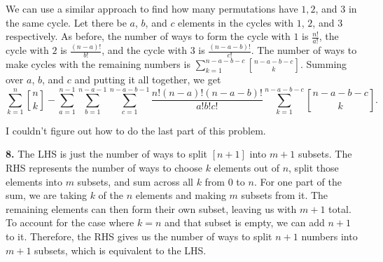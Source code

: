 \documentclass{article}
\begin{document}
We can use a similar approach to find how many permutations have $1, 2$, and $3$ in the same cycle. Let there be $a$, $b$, and $c$ elements in the cycles with $1$, $2$, and $3$ respectively. As before, the number of ways to form the cycle with $1$ is $\frac{n!}{a!}$, the cycle with $2$ is $\frac{(n - a)!}{b!}$, and the cycle with $3$ is $\frac{(n - a - b)!}{c!}$. The number of ways to make cycles with the remaining numbers is $\sum_{k = 1}^{n - a - b - c}{{n - a - b - c}\brack k}$. Summing over $a$, $b$, and $c$ and putting it all together, we get $$\sum_{k = 1}^n{n\brack k} - \sum_{a = 1}^{n - 1}\sum_{b = 1}^{n - a - 1}\sum_{c = 1}^{n - a - b - 1}\frac{n!(n - a)!(n - a - b)!}{a!b!c!}\sum_{k = 1}^{n - a - b - c}{{n - a - b - c}\brack k}.$$

I couldn't figure out how to do the last part of this problem.
\newline

\textbf{8.} The LHS is just the number of ways to split $[n + 1]$ into $m + 1$ subsets. The RHS represents the number of ways to choose $k$ elements out of $n$, split those elements into $m$ subsets, and sum across all $k$ from $0$ to $n$. For one part of the sum, we are taking $k$ of the $n$ elements and making $m$ subsets from it. The remaining elements can then form their own subset, leaving us with $m + 1$ total. To account for the case where $k = n$ and that subset is empty, we can add $n + 1$ to it. Therefore, the RHS gives us the number of ways to split $n + 1$ numbers into $m + 1$ subsets, which is equivalent to the LHS.
\end{document}
